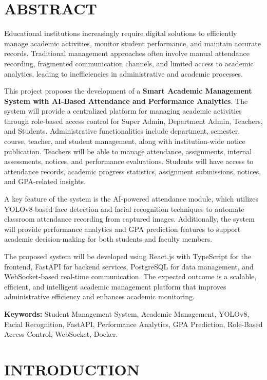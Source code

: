 \documentclass[12pt,a4paper,oneside]{report}
\begin{document}
\chapter*{ABSTRACT}
Educational institutions increasingly require digital solutions to efficiently manage academic activities, monitor student performance, and maintain accurate records. Traditional management approaches often involve manual attendance recording, fragmented communication channels, and limited access to academic analytics, leading to inefficiencies in administrative and academic processes.

This project proposes the development of a \textbf{Smart Academic Management System with AI-Based Attendance and Performance Analytics}. The system will provide a centralized platform for managing academic activities through role-based access control for Super Admin, Department Admin, Teachers, and Students. Administrative functionalities include department, semester, course, teacher, and student management, along with institution-wide notice publication. Teachers will be able to manage attendance, assignments, internal assessments, notices, and performance evaluations. Students will have access to attendance records, academic progress statistics, assignment submissions, notices, and GPA-related insights.

A key feature of the system is the AI-powered attendance module, which utilizes YOLOv8-based face detection and facial recognition techniques to automate classroom attendance recording from captured images. Additionally, the system will provide performance analytics and GPA prediction features to support academic decision-making for both students and faculty members.

The proposed system will be developed using React.js with TypeScript for the frontend, FastAPI for backend services, PostgreSQL for data management, and WebSocket-based real-time communication. The expected outcome is a scalable, efficient, and intelligent academic management platform that improves administrative efficiency and enhances academic monitoring.

\textbf{Keywords:} Student Management System, Academic Management, YOLOv8, Facial Recognition, FastAPI, Performance Analytics, GPA Prediction, Role-Based Access Control, WebSocket, Docker.

\tableofcontents
\clearpage
{}

\chapter{INTRODUCTION}
\end{document}
